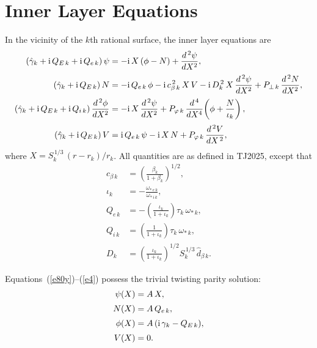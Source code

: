 \documentclass[12pt,prb,aps,notitlepage]{revtex4-1}
\begin{document}
\section{Inner Layer Equations}
In the vicinity of the $k$th rational surface, the inner layer equations are
\begin{align}\label{e80y}
(\hat{\gamma}_k+{\rm i}\,Q_{E\,k}+{\rm i}\,Q_{e\,k})\,\psi&= - {\rm i}\,X\left(\phi-N\right) + \frac{d^{\,2}\psi}{d X^2},\\[0.5ex]
(\hat{\gamma}_k+{\rm i}\,Q_{E\,k})\,N&= - {\rm i}\,Q_{e\,k}\,\phi -{\rm i}\,c_{\beta\,k}^{\,2}\,X\,V- {\rm i} \,D_k^{\,2}\,X\,\frac{d^{\,2}\psi}{d X^{2}}
+ P_{\perp\,k}\,\frac{d^{\,2} N}{d X^{2}},\label{e82y}\\[0.5ex]
(\hat{\gamma}_k+{\rm i}\,Q_{E\,k}+{\rm i}\,Q_{i\,k})\,\frac{d^{\,2}\phi}{d X^2}&= - {\rm i}\,X\,\frac{d^{\,2}\psi}{d X^2}+ P_{\varphi\,k}\,\frac{d^{\,4}}{d X^4}\!\left(\phi + \frac{N}{\iota_k}\right),\\[0.5ex]
(\hat{\gamma}_k+ {\rm i}\,Q_{E\,k})\, V&= {\rm i}\,Q_{e\,k}\,\psi - {\rm i}\,X\,N + P_{\varphi\,k}\,\frac{d^{\,2}V}{dX^{\,2}},\label{e4}
\end{align}
where $X=S_k^{\,1/3}\,(r-r_k)/r_k$. All quantities are as defined in TJ2025, except that 
\begin{align}
c_{\beta\,k} &= \left(\frac{\beta_k}{1+\beta_k}\right)^{1/2},\\[0.5ex]
\iota_k &= -\frac{\omega_{\ast\,e\,k}}{\omega_{\ast\,i\,k}},\\[0.5ex]
Q_{e\,k} &= -\left(\frac{\iota_{k}}{1+\iota_k}\right)\tau_k\,\omega_{\ast\,k},\\[0.5ex]
Q_{i\,k} &= \left(\frac{1}{1+\iota_k}\right)\tau_k\,\omega_{\ast\,k},\\[0.5ex]
D_k &= \left(\frac{\iota_k}{1+\iota_k}\right)^{1/2}S_k^{\,1/3}\,\hat{d}_{\beta\,k}.
\end{align}

Equations~(\ref{e80y})--(\ref{e4}) possess the trivial twisting parity solution:
\begin{align}
\psi(X) &= A\,X,\\[0.5ex]
N(X) &= A\,Q_{e\,k},\\[0.5ex]
\phi(X) &= A\,({\rm i}\,\gamma_k - Q_{E\,k}),\\[0.5ex]
V(X) & =0.
\end{align}
\end{document}
